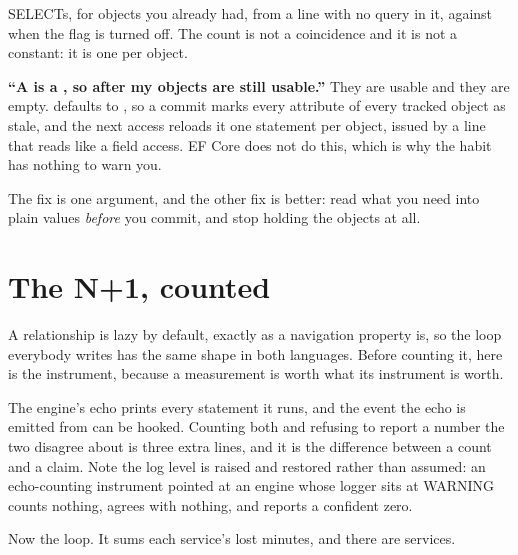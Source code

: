 

\noindent
{} SELECTs, for  objects you already
had, from a line with no query in it, against  when the
flag is turned off. The count is not a coincidence and it is not a constant:
it is one per object.

\begin{trapbox}
\textbf{\enquote{A  is a , so after
 my objects are still usable.}} They are usable and they are
empty.  defaults to , so a commit marks
every attribute of every tracked object as stale, and the next access
reloads it \dash{} one statement per object, issued by a line that reads
like a field access. EF Core does not do this, which is why the habit has
nothing to warn you.

The fix is one argument, and the other fix is better: read what you need
into plain values \emph{before} you commit, and stop holding the objects at
all.
\end{trapbox}

\section{The N+1, counted}
\label{sec:ch10-nplusone}

A relationship is lazy by default, exactly as a navigation property is, so
the loop everybody writes has the same shape in both languages. Before
counting it, here is the instrument, because a measurement is worth what its
instrument is worth.


\noindent
The engine's echo prints every statement it runs, and the event the echo is
emitted from can be hooked. Counting both and refusing to report a number
the two disagree about is three extra lines, and it is the difference
between a count and a claim. Note the log level is raised and restored
rather than assumed: an echo-counting instrument pointed at an engine whose
logger sits at WARNING counts nothing, agrees with nothing, and reports a
confident zero.

Now the loop. It sums each service's lost minutes, and there are
 services.

